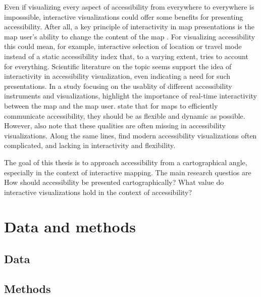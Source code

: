 \documentclass[12pt]{article}
\begin{document}
Even if visualizing every aspect of accessibility from everywhere to everywhere is imposssible,
interactive visualizations could offer some benefits for presenting accessibility.
After all, a key principle of interactivity in map presentations is
the map user's ability to change the content of the map \parencite{rot2013}.
For visualizing accessibility this could mean, for example,
interactive selection of location or travel mode instead of
a static accessibility index that, to a varying extent, tries to account for everything.
Scientific literature on the topic seems support the idea of
interactivity in accessibility visualization, even indicating a need for such presentations.
In a study focusing on the usablity of different accessibility instruments and visualizations,  %
\textcite{te2014} highlight the importance of real-time interactivity between the map and the map user.
\textcite{but2018} state that for maps to efficiently communicate accessibility,
they should be as flexible and dynamic as possible.
However, \citeauthor{but2018} also note that these qualities are often missing in accessibility visualizations.
Along the same lines, \textcite{paj2021} find modern accessibility visualizations often complicated,
and lacking in interactivity and flexibility.


The goal of this thesis is to approach accessibility from a cartographical angle,
especially in the context of interactive mapping.
The main research questios are
How should accessibility be presented cartographically?
What value do interactive visualizations hold in the context of accessibility?



\section{Data and methods}

\subsection{Data}

\subsection{Methods}

\printbibliography
\end{document}
